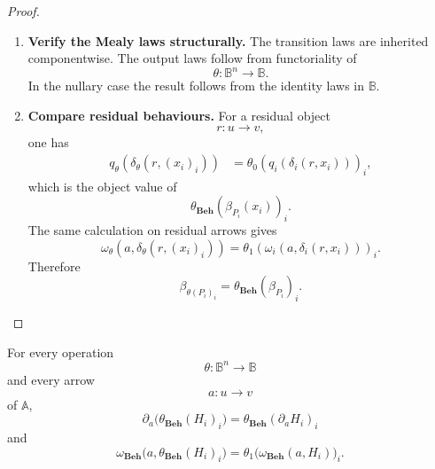 \begin{proof}
\begin{enumerate}
        \item \textbf{Verify the Mealy laws structurally.}
        The transition laws are inherited componentwise. The output laws follow
        from functoriality of
        \[
            \theta:\mathbb B^n\to\mathbb B.
        \]
        In the nullary case the result follows from the identity laws in
        \(\mathbb B\).

        \item \textbf{Compare residual behaviours.}
        For a residual object
        \[
            r:u\to v,
        \]
        one has
        \[
        \begin{aligned}
            q_\theta(\delta_\theta(r,(x_i)_i))
            &=
            \theta_0(q_i(\delta_i(r,x_i)))_i,
        \end{aligned}
        \]
        which is the object value of
        \[
            \theta_{\mathbf{Beh}}(\beta_{P_i}(x_i))_i.
        \]
        The same calculation on residual arrows gives
        \[
            \omega_\theta(a,\delta_\theta(r,(x_i)_i))
            =
            \theta_1(\omega_i(a,\delta_i(r,x_i)))_i.
        \]
        Therefore
        \[
            \beta_{\theta(P_i)_i}
            =
            \theta_{\mathbf{Beh}}(\beta_{P_i})_i.
        \]
    \end{enumerate}
\end{proof}

\begin{lemma}
\label{lem:operations-preserve-derivatives-output}
    For every operation
    \[
        \theta:\mathbb B^n\to\mathbb B
    \]
    and every arrow
    \[
        a:u\to v
    \]
    of \(\mathbb A\),
    \[
        \partial_a\bigl(\theta_{\mathbf{Beh}}(H_i)_i\bigr)
        =
        \theta_{\mathbf{Beh}}(\partial_aH_i)_i
    \]
    and
    \[
        \omega_{\mathbf{Beh}}
        \bigl(a,\theta_{\mathbf{Beh}}(H_i)_i\bigr)
        =
        \theta_1\bigl(\omega_{\mathbf{Beh}}(a,H_i)\bigr)_i.
    \]
\end{lemma}

